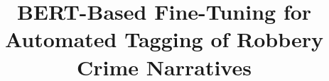 \documentclass[onecolumn, journal, english, 12pt, a4paper]{IEEEtran} %
\theoremstyle{definition}
\begin{document}
%
\title{BERT-Based Fine-Tuning for Automated Tagging of Robbery Crime Narratives}
%
%
%

\end{document}
